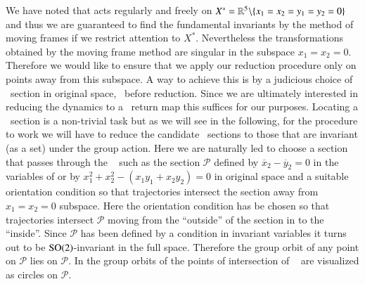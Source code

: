 We have noted that  acts regularly and freely on
$X^*=\mathbb{R}^{5}\backslash\{x_1=x_2=y_1=y_2=0\}$ and thus we are
guaranteed to find the fundamental invariants by the method
of moving frames if we restrict attention to $X^*$.
Nevertheless the transformations  obtained
by the moving frame method are singular in the subspace
$x_1=x_2=0$.
Therefore we would like to ensure that we apply our
reduction procedure only on points away from this subspace. A
way to achieve this is by a judicious choice of \Poincare\
section in original space, \ie~before reduction. Since we are
ultimately interested in reducing the dynamics to a
\Poincare\ return map this suffices for our purposes.
Locating a \Poincare\ section is a non-trivial task
but as we will see in the following, for the procedure to
work we will have to reduce the candidate \Poincare\ sections
to those that are invariant (as a set) under the group
action. 
Here
we are naturally led to choose a section that passes through
the \reqv~ such as the section $\mathcal{P}$
defined by $\overline{x}_2-\overline{y}_2=0$ in the variables
of  or by $x_1^2+x_2^2-(x_1 y_1 + x_2
y_2)=0$ in original space and a suitable orientation
condition so that trajectories intersect the section away
from $x_1=x_2=0$ subspace. Here the orientation condition has
be chosen so that trajectories intersect $\mathcal{P}$ moving
from the ``outside'' of the section in
 to the ``inside''. Since
$\mathcal{P}$ has been defined by a condition in invariant
variables  it turns out to be
$\textrm{SO}(2)$-invariant in the full space. Therefore the group
orbit of any point on $\mathcal{P}$ lies on $\mathcal{P}$. In
 the group orbits of the points of
intersection of \rpo~ are visualized as circles
on $\mathcal{P}$.

